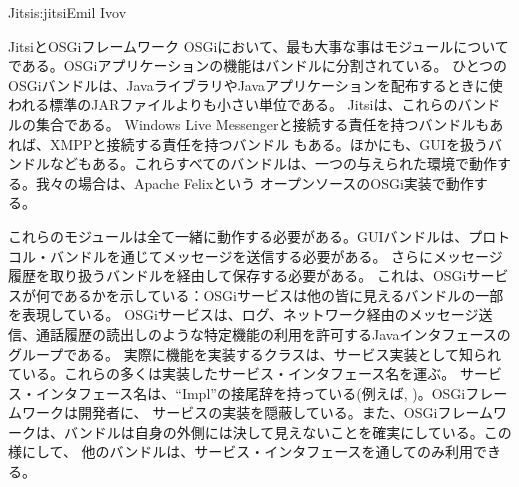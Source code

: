\begin{aosachapter}{Jitsi}{s:jitsi}{Emil Ivov}
\begin{aosasect1}{JitsiとOSGiフレームワーク}
OSGiにおいて、最も大事な事はモジュールについてである。OSGiアプリケーションの機能はバンドルに分割されている。
ひとつのOSGiバンドルは、JavaライブラリやJavaアプリケーションを配布するときに使われる標準のJARファイルよりも小さい単位である。
Jitsiは、これらのバンドルの集合である。 Windows Live Messengerと接続する責任を持つバンドルもあれば、XMPPと接続する責任を持つバンドル
もある。ほかにも、GUIを扱うバンドルなどもある。これらすべてのバンドルは、一つの与えられた環境で動作する。我々の場合は、Apache Felixという
オープンソースのOSGi実装で動作する。

これらのモジュールは全て一緒に動作する必要がある。GUIバンドルは、プロトコル・バンドルを通じてメッセージを送信する必要がある。
さらにメッセージ履歴を取り扱うバンドルを経由して保存する必要がある。
これは、OSGiサービスが何であるかを示している：OSGiサービスは他の皆に見えるバンドルの一部を表現している。
OSGiサービスは、ログ、ネットワーク経由のメッセージ送信、通話履歴の読出しのような特定機能の利用を許可するJavaインタフェースのグループである。
実際に機能を実装するクラスは、サービス実装として知られている。これらの多くは実装したサービス・インタフェース名を運ぶ。 
サービス・インタフェース名は、``Impl''の接尾辞を持っている(例えば, )。OSGiフレームワークは開発者に、
サービスの実装を隠蔽している。また、OSGiフレームワークは、バンドルは自身の外側には決して見えないことを確実にしている。この様にして、
他のバンドルは、サービス・インタフェースを通してのみ利用できる。


\end{aosasect1}
\end{aosachapter}
